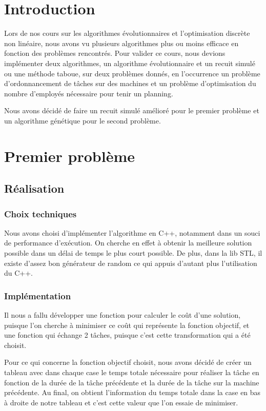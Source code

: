 \documentclass{report}
\begin{document}
\tableofcontents

\chapter{Introduction}
\minitoc
Lors de nos cours sur les algorithmes évolutionnaires et l'optimisation discrète non linéaire, nous avons vu plusieurs
algorithmes plus ou moins efficace en fonction des problèmes rencontrés. Pour valider ce cours, nous devions implémenter
deux algorithmes, un algorithme évolutionnaire et un recuit simulé ou une méthode taboue, sur deux problèmes donnés, en
l'occurrence un problème d'ordonnancement de tâches sur des machines et un problème d'optimisation du nombre d'employés nécessaire pour tenir un planning.

Nous avons décidé de faire un recuit simulé amélioré pour le premier problème et un algorithme génétique pour le second problème.
\newpage

\chapter{Premier problème}
\minitoc
\section{Réalisation}
\subsection{Choix techniques}
Nous avons choisi d'implémenter l'algorithme en C++, notamment dans un souci de performance d’exécution. On cherche en effet à obtenir la meilleure solution possible dans un délai de temps le plus court possible. De plus, dans la lib STL, il existe d'assez bon générateur de random ce qui appuis d'autant plus l'utilisation du C++.

\subsection{Implémentation}
Il nous a fallu développer une fonction pour calculer le coût d'une solution, puisque l'on cherche à minimiser ce coût qui représente la fonction objectif, et une fonction qui échange 2 tâches, puisque c'est cette transformation qui a été choisit.

Pour ce qui concerne la fonction objectif choisit, nous avons décidé de créer un tableau avec dans chaque case le temps totale nécessaire pour réaliser la tâche en fonction de la durée de la tâche précédente et la durée de la tâche sur la machine précédente. Au final, on obtient l'information du temps totale dans la case en bas à droite de notre tableau et c'est cette valeur que l'on essaie de minimiser.
\end{document}
